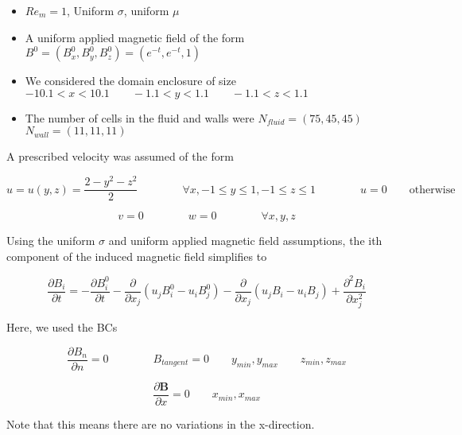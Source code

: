 \documentclass[11pt]{article}
\begin{document}
\begin{itemize}
\item $Re_m = 1$, Uniform $\sigma$, uniform $\mu$
\item A uniform applied magnetic field of the form $B^0 = (B_x^0,B_y^0,B_z^0) = (e^{-t},e^{-t},1)$
\item We considered the domain enclosure of size $-10.1 < x < 10.1 \qquad -1.1 < y < 1.1 \qquad -1.1 < z < 1.1$
\item The number of cells in the fluid and walls were $N_{fluid} = (75,45,45)$ \qquad $N_{wall} = (11,11,11)$
\end{itemize}

A prescribed velocity was assumed of the form

\begin{equation}
	u
	=
	u(y,z)
	= \frac{2 - y^2 - z^2}{2}
	\qquad \qquad
	\forall x
	,
	-1 \le y \le 1
	,
	-1 \le z \le 1
	\qquad \qquad
	u = 0
	\qquad
	\text{otherwise}
\end{equation}

\begin{equation}
	v = 0
	\qquad \qquad
	w = 0
	\qquad \qquad
	\forall x,y,z
\end{equation}


Using the uniform $\sigma$ and uniform applied magnetic field assumptions, the ith component of the induced magnetic field simplifies to

\begin{equation}
	\frac{\partial B_i}{\partial t}
	=
	-
	\frac{\partial B_i^0}{\partial t}
	-
	\frac{\partial}{\partial x_j} (u_j B_i^0 - u_i B_j^0)
	-
	\frac{\partial}{\partial x_j} (u_j B_i - u_i B_j)
	+
	\frac{\partial^2 B_i}{\partial x_j^2}
\end{equation}

Here, we used the BCs

\begin{equation}
	\frac{\partial B_{n}}{\partial n} = 0
	\qquad \qquad
	B_{tangent} = 0
	\qquad
	y_{min}, y_{max}
	\qquad
	z_{min}, z_{max}
\end{equation}

\begin{equation}
	\frac{\partial \pmb{B}}{\partial x} = 0
	\qquad
	x_{min}, x_{max}
\end{equation}

Note that this means there are no variations in the x-direction.
\end{document}
